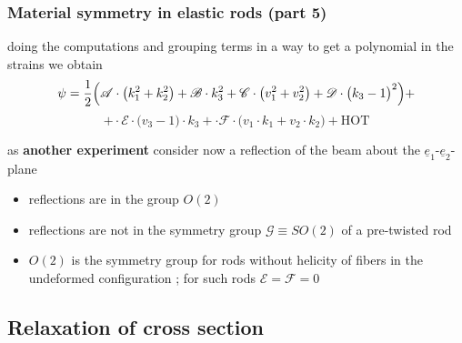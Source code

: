 \begin{frame}
  \frametitle{Material symmetry in elastic rods (part 5)}

  doing the computations and grouping terms in a way to get a polynomial in the strains we obtain
  \begin{displaymath}
    \psi =
    \frac{1}{2} \Bigl(
      \mathscr{A} \cdot \bigl( k_1^2 + k_2^2 \bigr) +
      \mathscr{B} \cdot k_3^2 +
      \mathscr{C} \cdot \bigl( v_1^2 + v_2^2 \bigr) +
      \mathscr{D} \cdot \bigl( k_3 - 1 \bigr)^2 \Bigr) +
  \end{displaymath}
  \begin{displaymath}
    + \cdot \mathscr{E} \cdot \bigl( v_3 - 1 \bigr) \cdot k_3 +
      \cdot \mathscr{F} \cdot \bigl( v_1 \cdot k_1 + v_2 \cdot k_2 \bigr)
    + \text{HOT}
  \end{displaymath}
  
  \vspace{1em}
  as \textbf{another experiment} consider now a reflection of the beam about the $\underline{e}_1$-$\underline{e}_2$-plane
  
  \vspace{0.3em}
  \begin{itemize}
    \item reflections are in the group $O(2)$
    \item reflections are not in the symmetry group $\mathscr{G} \equiv SO(2)$ of a pre-twisted rod
   \item $O(2)$ is the symmetry group for rods without helicity of fibers in the undeformed configuration ; for such rods $\mathscr{E} = \mathscr{F} = 0$ 
  \end{itemize}
 
\end{frame}


\subsection{Relaxation of cross section}

